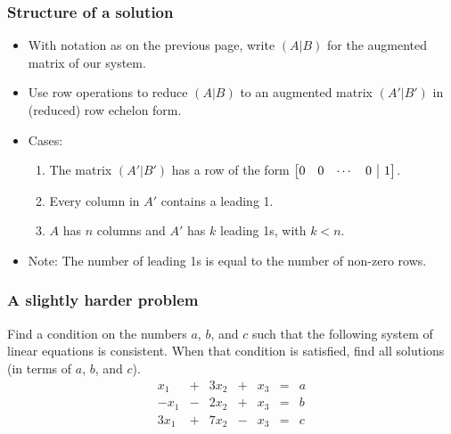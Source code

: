 \documentclass[12pt,t]{beamer}
\makeatletter
\newenvironment{amatrix}[1]{%
  \left[\begin{array}{@{}*{#1}{c}|c@{}}
}{%
  \end{array}\right]
}
\makeatother
\begin{document}
\begin{frame}\frametitle{Structure of a solution}
\begin{itemize}
 \item  With notation as on the previous page, write $(A|B)$ for the augmented matrix of our system.
 \item Use row operations to reduce $(A|B)$ to an augmented matrix $(A'|B')$ in (reduced) row echelon form.
 \item Cases:
\begin{enumerate}
 \item The matrix $(A'|B')$ has a row of the form $\begin{amatrix}{4}0&0&\cdots &0&1\end{amatrix}$.

\bigskip

 \item Every column in $A'$ contains a leading 1.

\bigskip

 \item $A$ has $n$ columns and $A'$ has $k$ leading 1s, with $k<n$.                                                                                 
\end{enumerate}

\bigskip

\bigskip 

\item Note: The number of leading 1s is equal to the number of non-zero rows.
\end{itemize}
\end{frame}
\begin{frame}\frametitle{A slightly harder problem}
 \begin{example}
  Find a condition on the numbers $a$, $b$, and $c$ such that the following system of linear equations is consistent. When that condition is satisfied, find all solutions (in terms of $a$, $b$, and $c$).
\[
 \begin{array}{rrrrrrr}
  x_1 &+& 3x_2 &+& x_3 &=& a\\
 -x_1 &-& 2x_2 &+& x_3 &=& b\\
 3x_1 &+& 7x_2 &-& x_3 &=& c
 \end{array}
\]
 \end{example}
\end{frame}
\end{document}
